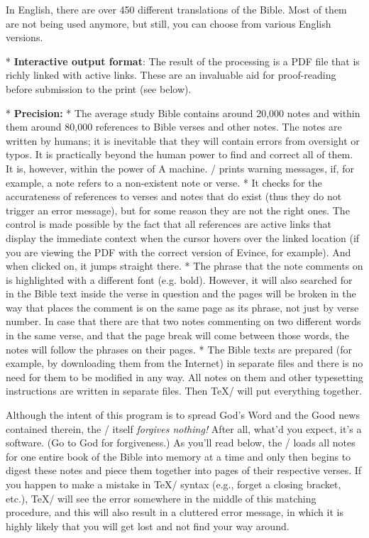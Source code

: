 {In English, there are over 450 different translations of the Bible.
Most of them are not being used anymore, but still, 
you can choose from  various English versions. 


* {\bf Interactive output format}:
  The result of the processing is a PDF file that is richly linked with active links. 
  These are an invaluable aid for proof-reading  before submission to the print (see below).

* {\bf Precision:} \begitems
  * The average study Bible contains around 20,000 notes and within them around 80,000
  references to Bible verses and other notes. The notes are written by humans; it is inevitable  that  they will contain errors from oversight or typos. It is practically beyond the human power 
  to find and correct  all of them. It is, however, within the power of A machine. \OpBible/ prints warning messages,  if, for example, a note refers to a non-existent note or verse.
*  It  checks for the accurateness of references to verses and notes that do exist (thus they do 
   not trigger an error message),
    but for some reason they are not the right ones.
    The control is made possible by the fact that all references are active links that display the immediate context when the cursor hovers over
   the linked location (if you are viewing the PDF with the correct version of Evince, for example). And when clicked on, it jumps straight there. 
  * The phrase that the note comments on is highlighted with a different font (e.g. bold).
    However, it will also searched for in the Bible text inside the verse in question and the pages will be broken in the way that places  the comment is on the same page as its phrase, not just by verse number.
    In case that there are  that two notes commenting on two different words in the same verse, and that    the page break will come between those words,  the notes will follow
   the phrases on their pages. %
   * The Bible texts are prepared (for example, by downloading them from the Internet) in separate files and there is no need for them to be modified in any way. All notes on them and other typesetting instructions are written in separate files. Then \TeX/ will put everything together.
    \enditems
\enditems

\lookout
Although the intent of this program is to spread God's Word and the Good news contained therein, the \OpBible/ itself {\it forgives nothing!} 
After all, what'd you expect, it's a software. (Go to God for forgiveness.) As you'll read below, the \OpBible/ loads all notes for one entire book of the Bible into memory at a time and only then  begins to digest these notes and piece them together into pages of their respective verses. If you happen to make a mistake in \TeX/ syntax (e.g., forget a closing bracket, etc.), \TeX/ will see the error somewhere in the middle of this matching procedure, and this will also result in a cluttered error message, in which it is highly likely that you will get lost and not find your way around.

}
